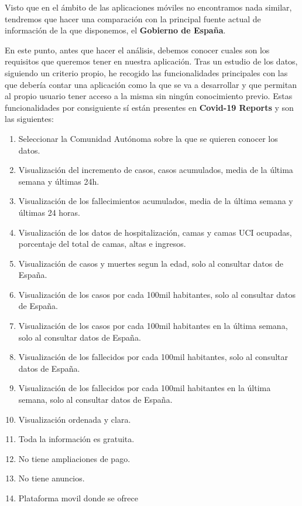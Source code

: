 Visto que en el ámbito de las aplicaciones móviles no encontramos nada similar, tendremos que hacer una comparación con la principal fuente actual de información de la que disponemos, el \textbf{Gobierno de España}.

En este punto, antes que hacer el análisis, debemos conocer cuales son los requisitos que queremos tener en nuestra aplicación. Tras un estudio de los datos, siguiendo un criterio propio, he recogido las funcionalidades principales con las que debería contar una aplicación como la que se va a desarrollar y que permitan al propio usuario tener acceso a la misma sin ningún conocimiento previo. Estas funcionalidades por consiguiente sí están presentes en \textbf{Covid-19 Reports} y son las siguientes:

\begin{enumerate}
	\item Seleccionar la Comunidad Autónoma sobre la que se quieren conocer los datos.
	\item Visualización del incremento de casos, casos acumulados, media de la última semana y últimas 24h.
	\item Visualización de los fallecimientos acumulados, media de la última semana y últimas 24 horas.
	\item Visualización de los datos de hospitalización, camas y camas UCI ocupadas, porcentaje del total de camas, altas e ingresos.
	\item Visualización de casos y muertes segun la edad, solo al consultar datos de España.
	\item Visualización de los casos por cada 100mil habitantes, solo al consultar datos de España.
	\item Visualización de los casos por cada 100mil habitantes en la última semana, solo al consultar datos de España.
	\item Visualización de los fallecidos por cada 100mil habitantes, solo al consultar datos de España.
	\item Visualización de los fallecidos por cada 100mil habitantes en la última semana, solo al consultar datos de España.
	\item Visualización ordenada y clara.
	\item Toda la información es gratuita.
	\item No tiene ampliaciones de pago.
	\item No tiene anuncios.
	\item Plataforma movil donde se ofrece
\end{enumerate}

